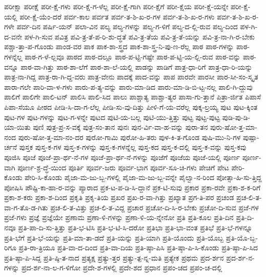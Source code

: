 {ಪರೀಕ್ಷಾ
ಪರೀಕ್ಷೆ
ಪರೀ-ಕ್ಷೆ-ಗಳು
ಪರೀ-ಕ್ಷೆ-ಗ-ಳೆಲ್ಲ
ಪರೀ-ಕ್ಷೆ-ಗಾಗಿ
ಪರೀ-ಕ್ಷೆಗೆ
ಪರೀ-ಕ್ಷೆಯ
ಪರೀ-ಕ್ಷೆ-ಯನ್ನೇ
ಪರೀ-ಕ್ಷೆ-ಯಲ್ಲಿ
ಪರೀ-ಕ್ಷೆ-ಯೆಂ-ದರೆ
ಪರ್ವ-ಕಾಲ
ಪರ್ವತ
ಪರ್ವ-ತ-ಶಿ-ಖ-ರ-ಗಳ
ಪರ್ವ-ತ-ಶಿ-ಖ-ರ-ಗಳು
ಪರ್ವ-ತ-ಶಿ-ಖ-ರ-ಗಳೇ
ಪರ್ವ-ದಿನ
ಪರ್ಷಿ-ಯನ್
ಪಲಾ-ವಿನ
ಪಲ್ಯ
ಪಲ್ಯ-ಗಳನ್ನು
ಪಲ್ಯ-ಗ-ಳಿಗೆ
ಪಲ್ಯ-ದ-ಲ್ಲಿ-ರುವ
ಪಲ್ಯ-ದಿಂದ
ಪಳ-ಗಿ-ದ-ವನೇ
ಪಳ-ಗಿ-ಸುವ
ಪವಿತ್ರ
ಪವಿ-ತ್ರ-ತೆ-ಪ-ರಿ-ಶು-ದ್ಧತೆ
ಪವಿ-ತ್ರ-ತೆಯ
ಪವಿ-ತ್ರ-ತೆ-ಯನ್ನು
ಪವಿ-ತ್ರ-ನಾ-ಗಿ-ರ-ಬೇಕು
ಪಶ್ಚಾ-ತ್ತಾ-ಪ-ಗೊಂಡು
ಪಾಂಡ-ವರ
ಪಾಕ
ಪಾಕ-ಶಾ-ಸ್ತ್ರದ
ಪಾಕ-ಶಾ-ಸ್ತ್ರ-ನಿ-ಪು-ಣ-ರೆಲ್ಲ
ಪಾಠ
ಪಾಠ-ಗಳನ್ನು
ಪಾಠ-ಗಳನ್ನೆಲ್ಲ
ಪಾಠ-ಗ-ಳೆ-ಲ್ಲವೂ
ಪಾಠದ
ಪಾಠ-ದಲ್ಲೂ
ಪಾಠ-ಪ-ಟ್ಟಿ-ಗಷ್ಟೇ
ಪಾಠ-ಪ-ಟ್ಟಿ-ಯ-ಲ್ಲಿ-ರುವ
ಪಾಠ-ವನ್ನು
ಪಾಠ-ವನ್ನೂ
ಪಾಠ-ವಾ-ಗಿತ್ತು
ಪಾಠ-ಶಾ-ಲೆಗೆ
ಪಾಠ-ಶಾ-ಲೆ-ಯಲ್ಲಿ
ಪಾಡನ್ನು
ಪಾಡಿಗೆ
ಪಾತ್ರ-ಧಾ-ರಿಗೆ
ಪಾತ್ರ-ಧಾ-ರಿ-ಯನ್ನು
ಪಾತ್ರ-ನಾ-ಗಿದ್ದ
ಪಾತ್ರ-ರಾ-ಗಿ-ದ್ದ-ವರು
ಪಾತ್ರ-ವೇನು
ಪಾದಕ್ಕೆ
ಪಾದ-ವನ್ನು
ಪಾಪ
ಪಾರವೇ
ಪಾರಸೀ
ಪಾರ-ಸೀ-ಸಂ-ಸ್ಕೃತ
ಪಾರಾ-ಗಲೇ
ಪಾರಿ-ವಾ-ಳ-ಗಳು
ಪಾರು-ಪ-ತ್ಯ-ವನ್ನು
ಪಾರು-ಮಾ-ಡಿದ
ಪಾರು-ಮಾ-ಡಿ-ಬಿ-ಟ್ಟ-ನಲ್ಲ
ಪಾಲಿ-ಗಿ-ದ್ದುವು
ಪಾಲಿಗೆ
ಪಾಲಿಗೇ
ಪಾಲಿ-ಟನ್
ಪಾಲಿಸಿ
ಪಾಲಿ-ಸಿದ
ಪಾಲು
ಪಾಶ್ಚಾತ್ಯ
ಪಾಶ್ಚಾ-ತ್ಯರ
ಪಾಸಾ-ಗು-ತ್ತಾನೆ
ಪಿತ್ರಾ-ರ್ಜಿತ
ಪಿಪಾಸೆ
ಪಿಪಾ-ಸೆಯೂ
ಪೀಠದ
ಪೀಡಿ-ಸಿ-ದಾ-ಗ-ಲೆಲ್ಲ
ಪೀಡಿ-ಸು-ವು-ದಿತ್ತು
ಪೀಳಿ-ಗೆ-ಯ-ವರೆಲ್ಲ
ಪುಕ್ಕ-ಲ್ರಯ್ಯ
ಪುಟ
ಪುಟ-ಕ್ಕಿಂತ
ಪುಟ-ಗಳ
ಪುಟ-ಗಳನ್ನು
ಪುಟ-ಗ-ಳನ್ನೇ
ಪುಟದ
ಪುಟಿ-ಯ-ಬಲ್ಲ
ಪುಟಿ-ಯು-ತ್ತಿತ್ತು
ಪುಟ್ಟ
ಪುಟ್ಟ-ಪುಟ್ಟ
ಪುಡಿ-ಪು-ಡಿ-ಯಾ-ಯಿತು
ಪುಣಿ
ಪುತ್ರ-ಪ್ರ-ಸ-ವಕ್ಕೆ
ಪುತ್ರ-ಸಂ-ತಾನ
ಪುನಃ
ಪುನ-ರ್ವಿ-ವಾ-ಹ-ವನ್ನು
ಪುರಾ-ತನ
ಪುರು-ಷೋ-ತ್ತ-ಮಾ-ನಂದ
ಪುರು-ಷೋ-ತ್ತ-ಮಾ-ನಂ-ದರ
ಪುರೋ-ಗಾಮಿ
ಪುರೋ-ಹಿ-ತರು
ಪುಳ-ಕಿ-ತ-ಗೊಂಡ
ಪುಷಿ-ಮು-ನಿ-ಗಳ
ಪುಷ್ಪಾ-ರ್ಚನೆ
ಪುಸ್ತಕ
ಪುಸ್ತ-ಕ-ಗಳ
ಪುಸ್ತ-ಕ-ಗಳನ್ನು
ಪುಸ್ತ-ಕ-ಗಳನ್ನೆಲ್ಲ
ಪುಸ್ತ-ಕದ
ಪುಸ್ತ-ಕ-ದಲ್ಲಿ
ಪುಸ್ತ-ಕ-ವನ್ನು
ಪುಸ್ತ-ಕವು
ಪೂಜಿಸಿ
ಪೂಜೆ
ಪೂಜೆ-ಪ್ರಾ-ರ್ಥ-ನೆ-ಗಳ
ಪೂಜೆ-ಪ್ರಾ-ರ್ಥ-ನೆ-ಗಳನ್ನು
ಪೂಜೆಗೆ
ಪೂಜೆಯ
ಪೂಜೆ-ಯಲ್ಲಿ
ಪೂರ್ಣ
ಪೂರ್ಣ-ವಾಗಿ
ಪೂರ್ಣ-ಶ್ರ-ದ್ಧೆ-ಯಿಂದ
ಪೂರ್ತಿ
ಪೂರ್ವ-ಜರು
ಪೂರ್ವ-ಭಾಗ
ಪೂರ್ವ-ಸೂ-ಚಿ-ಗಳು
ಪೇಚಿಗೆ
ಪೇಟ
ಪೇರಿ-ಕೊಂಡು
ಪೇರಿ-ಸಿ-ಕೊಂಡು
ಪೈಜಾ-ಮ-ಜು-ಬ್ಬ-ಗಳಲ್ಲಿ
ಪೈಜಾ-ಮ-ಜು-ಬ್ಬ-ವನ್ನೇ
ಪೈಲ್ವಾ-ನ-ರಿಂದ
ಪೋತ್ಸಾ-ಹಿ-ಸು-ತ್ತಿದ್ದ
ಪೋಷಿಸಿ
ಪೌಷ್ಟಿ-ಕಾ-ಹಾ-ರ-ವನ್ನು
ಪ್ಯಾರಾದ
ಪ್ರಕ-ಟ-ಪ-ಡಿ-ಸಿ-ದ್ದಾನೆ
ಪ್ರಕ-ಟಿ-ಸುವು
ಪ್ರಕಾರ
ಪ್ರಕಾ-ರವೇ
ಪ್ರಕಾ-ಶ-ಕ-ರಿಗೆ
ಪ್ರಕಾ-ಶ-ಕರು
ಪ್ರಕಾ-ಶ-ದಿಂದ
ಪ್ರಕೃತಿ
ಪ್ರಕೃ-ತಿಯ
ಪ್ರಖರ
ಪ್ರಖ-ರ-ವಾ-ಗಿತ್ತು
ಪ್ರಖ್ಯಾತ
ಪ್ರಗ-ತಿ-ಪರ
ಪ್ರಚಂಡ
ಪ್ರಚ-ಲಿ-ತ-ವಾ-ಗ-ತೊ-ಡ-ಗಿತು
ಪ್ರಚ-ಲಿ-ತ-ವಿತ್ತು
ಪ್ರಚ-ಲಿ-ತ-ವಿದ್ದ
ಪ್ರಚಾರ
ಪ್ರಚೋ-ದಿ-ಸಿ-ರ-ಬೇಕು
ಪ್ರಚೋ-ದಿ-ಸುವ
ಪ್ರಜೆ-ಗಳ
ಪ್ರಜೆ-ಗಳು
ಪ್ರಜ್ಞೆ
ಪ್ರಜ್ಞೆಯೇ
ಪ್ರಣಾಮ
ಪ್ರಣಾ-ಳಿ-ಗಳನ್ನು
ಪ್ರಣಾ-ಳಿ-ಯ-ನ್ನೇನೋ
ಪ್ರತಿ
ಪ್ರತಿ-ಕೂಲ
ಪ್ರತಿ-ದಿನ
ಪ್ರತಿ-ದಿ-ನವೂ
ಪ್ರತಿ-ಪಾ-ದಿ-ಸು-ತ್ತಿತ್ತು
ಪ್ರತಿ-ಭ-ಟಿಸಿ
ಪ್ರತಿ-ಭ-ಟಿ-ಸಿ-ದರೋ
ಪ್ರತಿಭಾ
ಪ್ರತಿ-ಭಾ-ವಂತ
ಪ್ರತಿಭೆ
ಪ್ರತಿ-ಭೆ-ಗಳನ್ನೂ
ಪ್ರತಿ-ಭೆಗೆ
ಪ್ರತಿ-ಭೆ-ಯನ್ನು
ಪ್ರತಿ-ಮಾ-ತಾ-ಡದೆ
ಪ್ರತಿ-ಯನ್ನು
ಪ್ರತಿ-ಯಾಗಿ
ಪ್ರತಿ-ಯೊಂದು
ಪ್ರತಿ-ಯೊಬ್ಬ
ಪ್ರತಿ-ಯೊ-ಬ್ಬ-ರಿಗೂ
ಪ್ರತಿ-ರಾ-ತ್ರಿಯೂ
ಪ್ರತಿ-ವಾ-ದ-ದಿಂದ
ಪ್ರತಿ-ವಾ-ದಿಯ
ಪ್ರತಿ-ಷ್ಠಾ-ಪಿಸಿ
ಪ್ರತಿ-ಷ್ಠಾ-ಪಿ-ಸಿ-ಕೊಂಡು
ಪ್ರತಿ-ಷ್ಠಾ-ಪಿ-ಸಿದ
ಪ್ರತಿ-ಷ್ಠಾ-ಪಿ-ಸಿದ್ದ
ಪ್ರತಿ-ಷ್ಠಿ-ತ-ನಾದ
ಪ್ರತ್ಯಕ್ಷ
ಪ್ರತ್ಯು-ತ್ತರ
ಪ್ರತ್ಯು-ತ್ಪ-ನ್ನ-ಮತಿ
ಪ್ರತ್ಯೇಕ
ಪ್ರಥಮ
ಪ್ರದ-ರ್ಶನ
ಪ್ರದ-ರ್ಶ-ನ-ಗಳನ್ನು
ಪ್ರದ-ರ್ಶ-ನಾ-ಲ-ಗ-ಳಿಗೋ
ಪ್ರದೇ-ಶ-ಗಳಲ್ಲಿ
ಪ್ರದೇ-ಶದ
ಪ್ರಧಾನ
ಪ್ರಪಂ-ಚದ
ಪ್ರಪಂ-ಚ-ದಲ್ಲಿ
}
